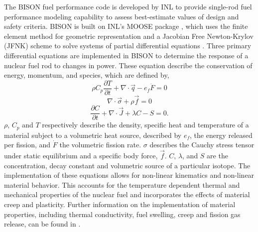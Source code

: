 \documentclass[edeposit,fullpage,11pt]{uiucthesis2009}
\begin{document}
The BISON fuel performance code is developed by \gls{INL} to provide single-rod fuel performance modeling capability to assess best-estimate values of design and safety criteria. 
BISON is built on \gls{INL}'s \gls{MOOSE} package \cite{gaston_moose:_2009}, which uses the finite element method for geometric representation and a Jacobian Free Newton-Krylov (JFNK) scheme to solve systems of partial differential equations \cite{williamson_multidimensional_2012}. 
Three primary differential equations are implemented in BISON to determine the response of a nuclear fuel rod to changes in  power.
These equation describe the conservation of energy, momentum, and species, which are defined by,
\begin{equation} \label{eqn:bis_eng}
\rho C_p \frac{\partial T}{\partial t} + \nabla \cdot \vec{q} - e_f \dot{F} =0
\end{equation} 
\begin{equation} \label{eqn:bis_mom}
\nabla \cdot \vec{\sigma} + \rho \vec{f} =0
\end{equation} 
\begin{equation} \label{eqn:bis_spec}
\frac{\partial C}{\partial t} + \nabla \cdot \vec{J} +\lambda C - S =0.
\end{equation} 
$\rho$, $C_p$ and $T$ respectively describe the density, specific heat and temperature of a material subject to a volumetric heat source, described by $e_f$, the energy released per fission, and $\dot{F}$ the volumetric fission rate.
$\sigma$ describes the Cauchy stress tensor under static equilibrium and a specific body force, $\vec{f}$.
$C$, $\lambda$, and $S$ are the concentration, decay constant and volumetric source of a particular isotope.
The implementation of these equations allows for non-linear kinematics and non-linear material behavior.
This accounts for the temperature dependent thermal and mechanical properties of the nuclear fuel and incorporates the effects of material creep and plasticity.
Further information on the implementation of material properties, including thermal conductivity, fuel swelling, creep and fission gas release, can be found in \cite{williamson_validating_2016,hales_bison_2015}.
\end{document}
